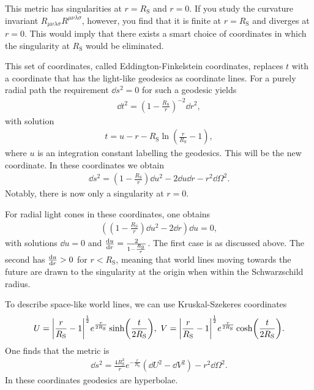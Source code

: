 This metric has singularities at $r = R_{\text{S}}$ and $r = 0$. If you study the curvature invariant $R_{\mu\nu\lambda\sigma}R^{\mu\nu\lambda\sigma}$, however, you find that it is finite at $r = R_{\text{S}}$ and diverges at $r = 0$. This would imply that there exists a smart choice of coordinates in which the singularity at $R_{\text{S}}$ would be eliminated.

This set of coordinates, called Eddington-Finkelstein coordinates, replaces $t$ with a coordinate that has the light-like geodesics as coordinate lines. For a purely radial path the requirement $\dd{s}^{2} = 0$ for such a geodesic yields
\begin{align*}
	\dd{t}^{2} = \left(1 - \frac{R_{\text{S}}}{r}\right)^{-2}\dd{r}^{2},
\end{align*}
with solution
\begin{align*}
	t = u - r - R_{\text{S}}\ln(\frac{r}{R_{\text{S}}} - 1),
\end{align*}
where $u$ is an integration constant labelling the geodesics. This will be the new coordinate. In these coordinates we obtain
\begin{align*}
	\dd{s}^{2} = \left(1 - \frac{R_{\text{S}}}{r}\right)\dd{u}^{2} - 2\dd{u}\dd{r} - r^{2}\dd{\Omega}^{2}.
\end{align*}
Notably, there is now only a singularity at $r = 0$.

For radial light cones in these coordinates, one obtains
\begin{align*}
	\left(\left(1 - \frac{R_{\text{S}}}{r}\right)\dd{u}^{2} - 2\dd{r}\right)\dd{u} = 0,
\end{align*}
with solutions $\dd{u} = 0$ and $\dv{u}{r} = \frac{2}{1 - \frac{R_{\text{S}}}{r}}$. The first case is as discussed above. The second has $\dv{u}{r} > 0$ for $r < R_{\text{S}}$, meaning that world lines moving towards the future are drawn to the singularity at the origin when within the Schwarzschild radius.

To describe space-like world lines, we can use Kruskal-Szekeres coordinates
\begin{align*}
	U = \abs{\frac{r}{R_{\text{S}}} - 1}^{\frac{1}{2}}e^{\frac{r}{2R_{\text{S}}}}\sinh(\frac{t}{2R_{\text{S}}}),\ V = \abs{\frac{r}{R_{\text{S}}} - 1}^{\frac{1}{2}}e^{\frac{r}{2R_{\text{S}}}}\cosh(\frac{t}{2R_{\text{S}}}).
\end{align*}
One finds that the metric is
\begin{align*}
	\dd{s}^{2} = \frac{4R_{\text{S}}^{3}}{r}e^{-\frac{r}{R_{\text{S}}}}(\dd{U}^{2} - \dd{V}^{2}) - r^{2}\dd{\Omega}^{2}.
\end{align*}
In these coordinates geodesics are hyperbolae.

